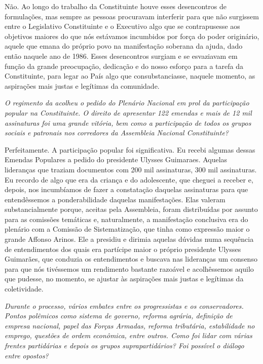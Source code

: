 Não. Ao longo do trabalho da Constituinte houve
esses desencontros de formulações, mas sempre as pessoas procuravam
interferir para que não surgissem entre o Legislativo Constituinte e o
Executivo algo que se contrapusesse aos objetivos maiores do que nós
estávamos incumbidos por força do poder originário, aquele que emana do
próprio povo na manifestação soberana da ajuda, dado então naquele ano
de 1986. Esses desencontros surgiam e se esvaziavam em função da grande
preocupação, dedicação e do nosso esforço para a tarefa da Constituinte,
para legar ao País algo que consubstanciasse, naquele momento, as
aspirações mais justas e legítimas da comunidade.

\medskip

\noindent\emph{O regimento da  acolheu o pedido do Plenário Nacional em prol
da participação popular na Constituinte. O direito de apresentar 122
emendas e mais de 12 mil assinaturas foi uma grande vitória, bem como a
participação de todos os grupos sociais e patronais nos corredores da
Assembleia Nacional Constituinte?}

Perfeitamente. A participação popular foi
significativa. Eu recebi algumas dessas Emendas Populares a pedido do
presidente Ulysses Guimaraes. Aquelas lideranças que traziam documentos
com 200 mil assinaturas, 300 mil assinaturas. Eu recordo de algo que era
da criança e do adolescente, que cheguei a receber e, depois, nos
incumbíamos de fazer a constatação daquelas assinaturas para que
entendêssemos a ponderabilidade daquelas manifestações. Elas valeram
substancialmente porque, aceitas pela Assembleia, foram distribuídas por
assunto para as comissões temáticas e, naturalmente, a manifestação
conclusiva era do plenário com a Comissão de Sistematização, que tinha
como expressão maior o grande Affonso Arinos. Ele a presidiu e dirimia
aquelas dúvidas numa sequência de entendimentos dos quais era partícipe
maior o próprio presidente Ulysses Guimarães, que conduzia os
entendimentos e buscava nas lideranças um consenso para que nós
tivéssemos um rendimento bastante razoável e acolhêssemos aquilo que
pudesse, no momento, se ajustar às aspirações mais justas e legítimas da
coletividade.

\medskip

\noindent\emph{Durante o processo, vários embates entre os progressistas e os
conservadores. Pontos polêmicos como sistema de governo, reforma
agrária, definição de empresa nacional, papel das Forças Armadas,
reforma tributária, estabilidade no emprego, questões de ordem
econômica, entre outros. Como foi lidar com várias frentes partidárias e
depois os grupos suprapartidários? Foi possível o diálogo entre
opostos?}


